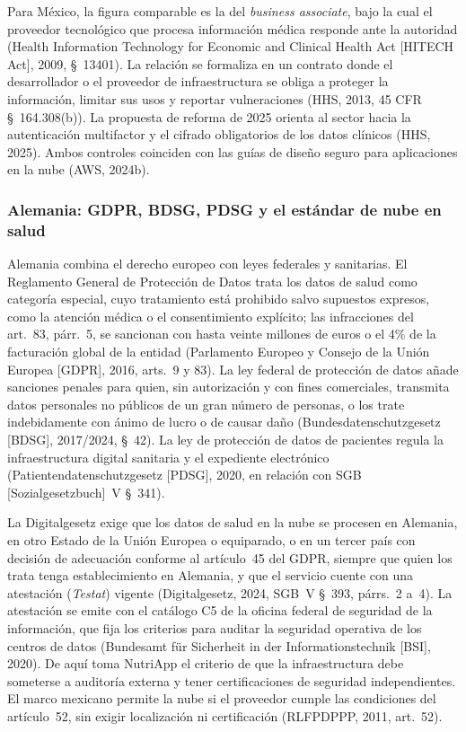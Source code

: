 \documentclass[12pt, a4paper]{article}
\begin{document}
Para México, la figura comparable es la del \textit{business
associate}, bajo la cual el proveedor tecnológico que procesa
información médica responde ante la autoridad (Health Information
Technology for Economic and Clinical Health Act [HITECH Act], 2009,
\S~13401). La relación se formaliza en un contrato donde el
desarrollador o el proveedor de infraestructura se obliga a proteger
la información, limitar sus usos y reportar vulneraciones (HHS, 2013,
45 CFR \S~164.308(b)). La propuesta de reforma de 2025 orienta al
sector hacia la autenticación multifactor y el cifrado obligatorios
de los datos clínicos (HHS, 2025). Ambos controles coinciden con las
guías de diseño seguro para aplicaciones en la nube (AWS, 2024b).

\subsubsection{Alemania: GDPR, BDSG, PDSG y el estándar de nube en salud}

Alemania combina el derecho europeo con leyes federales y sanitarias.
El Reglamento General de Protección de Datos trata los datos de salud como categoría especial, cuyo
tratamiento está prohibido salvo supuestos expresos, como la atención
médica o el consentimiento explícito; las infracciones del art.~83, párr.~5, se
sancionan con hasta veinte millones de euros o el 4\% de la
facturación global de la entidad (Parlamento Europeo y Consejo de la
Unión Europea [GDPR], 2016, arts.~9 y 83). La ley federal de
protección de datos añade sanciones penales para quien, sin autorización y con fines comerciales, transmita datos personales no públicos de un gran número de personas, o los trate indebidamente con ánimo de lucro o de causar daño (Bundesdatenschutzgesetz [BDSG], 2017/2024, \S~42). La ley de protección de datos de pacientes
regula la infraestructura digital sanitaria y el expediente
electrónico (Patientendatenschutzgesetz [PDSG], 2020, en relación con
SGB [Sozialgesetzbuch]~V \S~341).
 
La Digitalgesetz
exige que los datos de salud en la nube se procesen en Alemania, en otro Estado de la Unión Europea o equiparado, o en un tercer país con decisión de adecuación conforme al artículo~45 del GDPR, siempre que quien los trata tenga establecimiento en Alemania, y que el servicio cuente con una atestación (\textit{Testat}) vigente (Digitalgesetz, 2024, SGB~V \S~393, párrs.~2 a~4). La atestación se emite con el
catálogo C5 de la oficina federal de seguridad de la
información, que fija los criterios para auditar la seguridad
operativa de los centros de datos (Bundesamt für Sicherheit in der
Informationstechnik [BSI], 2020). De aquí toma NutriApp el criterio
de que la infraestructura debe someterse a auditoría externa y tener
certificaciones de seguridad independientes. El marco mexicano
permite la nube si el proveedor cumple las condiciones del
artículo~52, sin exigir localización ni certificación (RLFPDPPP,
2011, art.~52).
\end{document}
